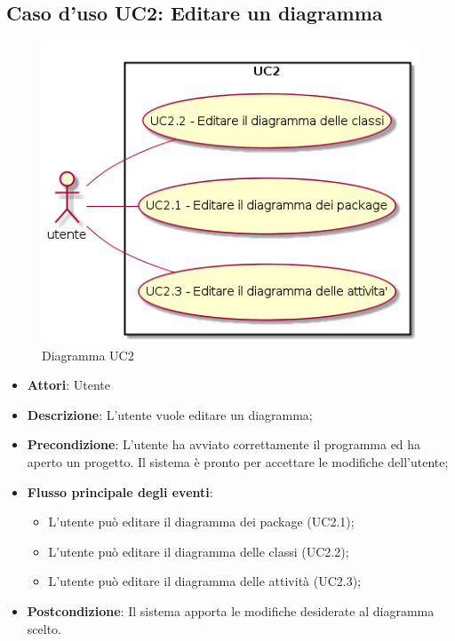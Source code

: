 \documentclass[../AnalisiDeiRequisiti.tex]{subfiles}
\begin{document}
	\subsection{Caso d'uso UC2: Editare un diagramma}
		\begin{figure} [H]
			\centering
			\includegraphics[scale=0.45]{./Figures/UC2.png}
			\caption{Diagramma UC2}\label{}
		\end{figure}
	\begin{itemize}
		\item \textbf{Attori}: Utente
		\item \textbf{Descrizione}: L'utente vuole editare un diagramma;
		\item \textbf{Precondizione}: L'utente ha avviato correttamente il programma ed ha aperto un progetto. Il sistema è pronto per accettare le modifiche dell'utente;
		\item \textbf{Flusso principale degli eventi}: \begin{itemize}
			\item L'utente può editare il diagramma dei package (UC2.1);
			\item L'utente può editare il diagramma delle classi (UC2.2);
			\item L'utente può editare il diagramma delle attività (UC2.3);
		\end{itemize}
		\item \textbf{Postcondizione}: Il sistema apporta le modifiche desiderate al diagramma scelto.
	\end{itemize}
\end{document}
